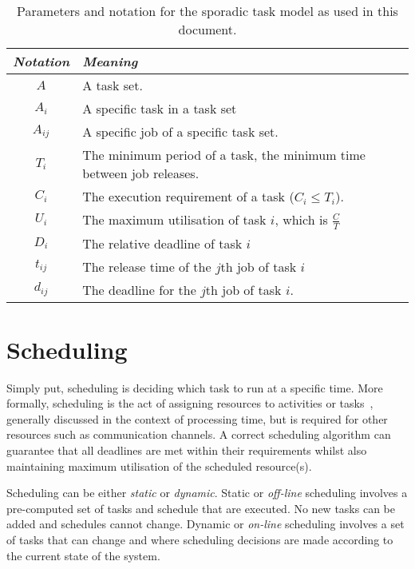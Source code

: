 \begin{table}
\centering
    \begin{tabular}{cp{}}\toprule
    \emph{Notation} & \emph{Meaning} \\\midrule
    $A$               & A task set. \\
    $A_{i}$           & A specific task in a task set \\
    $A_{ij}$          & A specific job of a specific task set. \\
    $T_{i}$           & The minimum period of a task, the minimum time between job releases. \\
    $C_{i}$           & The execution requirement of a task ($C_{i} \leq T_{i}$). \\
    $U_{i}$           & The maximum utilisation of task $i$, which is $\frac{C}{T}$ \\
    $D_{i}$           & The relative deadline of task $i$ \\
    $t_{ij}$          & The release time of the $j$th job of task $i$ \\
    $d_{ij}$          & The deadline for the $j$th job of task $i$. \\
    \bottomrule
    \end {tabular}
    \caption{Parameters and notation for the sporadic task model as used in this document.}
    \label{t:notation}
\end{table}

\section{Scheduling}
\label{sec:rt-scheduling}

Simply put, scheduling is deciding which task to run at a specific time. More formally, scheduling
is the act of assigning resources to activities or tasks~\citep{Baruah_CPV_96}, generally discussed
in the context of processing time, but is required for other resources such as communication
channels.  A correct scheduling algorithm  can guarantee that all deadlines are met within their
requirements whilst also maintaining maximum utilisation of the scheduled resource(s).

Scheduling can be either \emph{static} or \emph{dynamic}.  Static or \emph{off-line} scheduling
involves a pre-computed set of tasks and schedule that are executed.  No new tasks can be added and
schedules cannot change.  Dynamic or \emph{on-line} scheduling involves a set of tasks that can
change and where scheduling decisions are made according to the current state of the system.

